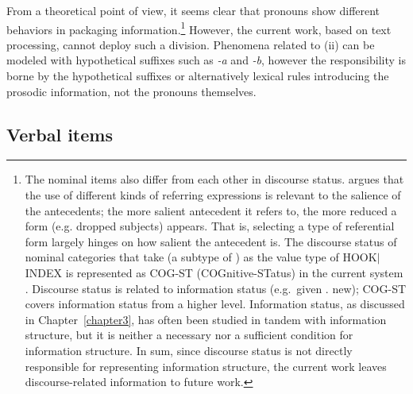 From a theoretical point of view, it seems clear that pronouns show
different behaviors in packaging information.\footnote{The nominal
  items also differ from each other in discourse status.
  \citet{kaiser:09} argues that the use of different kinds of
  referring expressions is relevant to the salience of the
  antecedents; the more salient antecedent it refers to, the more
  reduced a form (e.g.  dropped subjects) appears.  That is, selecting
  a type of referential form largely hinges on how salient the
  antecedent is.  The discourse status of nominal categories that take
   (a subtype of ) as the value type of
  HOOK{$\mid$}INDEX is represented as COG-ST (COGnitive-STatus) in the
  current \lingo {} system \citep{bender:goss:08}.
  Discourse status is related to information status (e.g.\ given
  \vs. new); COG-ST covers information status from a higher
  level. Information status, as discussed in Chapter~\ref{chapter3},
  has often been studied in tandem with information structure, but it
  is neither a necessary nor a sufficient condition for information
  structure.  In sum, since discourse status is not directly
  responsible for representing information structure, the current work
  leaves discourse-related information to future work.} However, the
current work, based on text processing, cannot deploy such a
division. Phenomena related to (ii) can be modeled with hypothetical
suffixes such as \textit{-a} and \textit{-b}, however the responsibility is borne by
the hypothetical suffixes or alternatively lexical rules introducing
the prosodic information, not the pronouns themselves.





\subsection{Verbal items}
\label{10:ssec:verbal}


